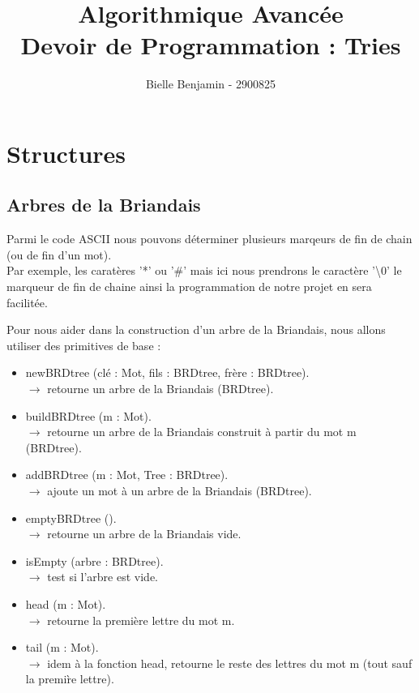 \documentclass[a4paper,8pt]{report}
\title{{\LARGE Algorithmique Avanc\'ee \\ Devoir de Programmation : Tries}}
\author{Bielle Benjamin - 2900825}
\begin{document}
\maketitle
\renewcommand{\contentsname}{Sommaire}
\tableofcontents

\chapter{Structures}
\section*{Arbres de la Briandais}\label{sec:name}

Parmi le code ASCII nous pouvons d\'eterminer plusieurs marqeurs de fin de chain (ou de fin d'un mot).\\
Par exemple, les carat\`eres '*' ou '\#' mais ici nous prendrons le caract\`ere '\textbackslash0' le marqueur de fin de chaine ainsi la programmation de notre projet en sera facilit\'ee.

\medskip
Pour nous aider dans la construction d'un arbre de la Briandais, nous allons utiliser des primitives de base :\\
\begin{itemize}
\item newBRDtree (cl\'e : Mot, fils : BRDtree, fr\`ere : BRDtree).\\
  $\rightarrow$ retourne un arbre de la Briandais (BRDtree).\\
\item buildBRDtree (m : Mot).\\
  $\rightarrow$ retourne un arbre de la Briandais construit \`a partir du mot m (BRDtree).\\
\item addBRDtree (m : Mot, Tree : BRDtree).\\
  $\rightarrow$ ajoute un mot \`a un arbre de la Briandais (BRDtree).\\
\item emptyBRDtree ().\\
  $\rightarrow$ retourne un arbre de la Briandais vide.\\
\item isEmpty (arbre : BRDtree).\\
  $\rightarrow$ test si l'arbre est vide.\\
\item head (m : Mot).\\
  $\rightarrow$ retourne la premi\`ere lettre du mot m.\\
\item tail (m : Mot).\\
  $\rightarrow$ idem \`a la fonction head, retourne le reste des lettres du mot m (tout sauf la premi\`re lettre).\\
\end{itemize}
\end{document}
